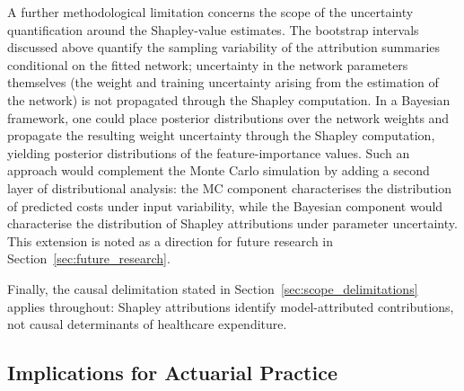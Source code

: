 A further methodological limitation concerns the scope of the
uncertainty quantification around the Shapley-value estimates.  The
bootstrap intervals discussed above quantify the sampling variability
of the attribution summaries conditional on the fitted network;
uncertainty in the network parameters themselves (the weight and
training uncertainty arising from the estimation of the network) is
not propagated through the Shapley computation.  In a
Bayesian framework, one could place posterior distributions over the
network weights and propagate the resulting weight uncertainty through the
Shapley computation, yielding posterior distributions of the
feature-importance values.  Such an approach would complement the Monte
Carlo simulation by adding a second layer of distributional analysis:
the MC component characterises the distribution of predicted
costs under input variability, while the Bayesian component would
characterise the distribution of Shapley attributions under parameter
uncertainty.  This extension is noted as a direction for future research
in Section~\ref{sec:future_research}.

Finally, the causal delimitation stated in
Section~\ref{sec:scope_delimitations} applies throughout: Shapley
attributions identify model-attributed contributions, not causal
determinants of healthcare expenditure.


\subsection{Implications for Actuarial Practice}
\label{sec:implications}

